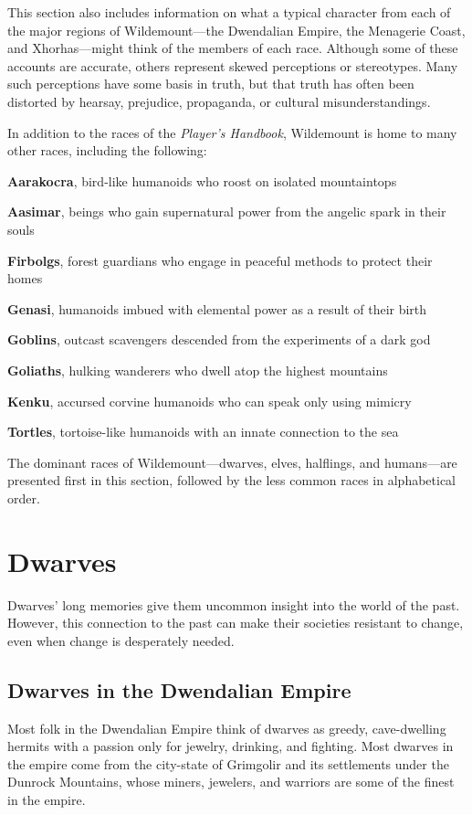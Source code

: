 \documentclass[10pt,a4paper,twoside,bg=print,twocolumn,openany,nodeprecatedcode]{dndbook}
\begin{document}
This section also includes information on what a typical character from each of the major regions of Wildemount—the Dwendalian Empire, the Menagerie Coast, and Xhorhas—might think of the members of each race. Although some of these accounts are accurate, others represent skewed perceptions or stereotypes. Many such perceptions have some basis in truth, but that truth has often been distorted by hearsay, prejudice, propaganda, or cultural misunderstandings.

In addition to the races of the \textit{Player's Handbook}, Wildemount is home to many other races, including the following:

\textbf{Aarakocra}, bird-like humanoids who roost on isolated mountaintops

\textbf{Aasimar}, beings who gain supernatural power from the angelic spark in their souls

\textbf{Firbolgs}, forest guardians who engage in peaceful methods to protect their homes

\textbf{Genasi}, humanoids imbued with elemental power as a result of their birth

\textbf{Goblins}, outcast scavengers descended from the experiments of a dark god

\textbf{Goliaths}, hulking wanderers who dwell atop the highest mountains

\textbf{Kenku}, accursed corvine humanoids who can speak only using mimicry

\textbf{Tortles}, tortoise-like humanoids with an innate connection to the sea

The dominant races of Wildemount—dwarves, elves, halflings, and humans—are presented first in this section, followed by the less common races in alphabetical order.

\section{Dwarves}
Dwarves' long memories give them uncommon insight into the world of the past. However, this connection to the past can make their societies resistant to change, even when change is desperately needed.

\subsection{Dwarves in the Dwendalian Empire}
Most folk in the Dwendalian Empire think of dwarves as greedy, cave-dwelling hermits with a passion only for jewelry, drinking, and fighting. Most dwarves in the empire come from the city-state of Grimgolir and its settlements under the Dunrock Mountains, whose miners, jewelers, and warriors are some of the finest in the empire.
\end{document}
